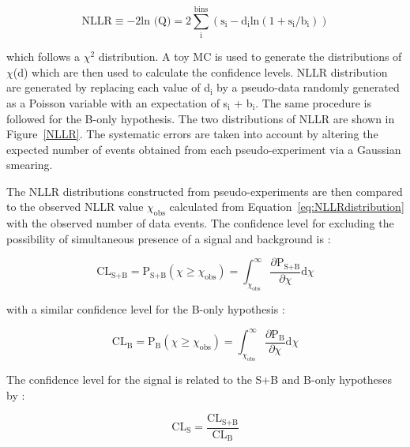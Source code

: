 \documentclass[main.tex]{subfiles}
\begin{document}
\begin{equation}\label{eq:NLLRdistribution}
\text{NLLR} \equiv -\text{2} \text{ln (Q)} = \text{2} \sum _\text{i}^{\text{bins}} (\text{s}_\text{i}  - \text{d}_\text{i} \text{ln} (1 + \text{s}_\text{i}/\text{b}_\text{i}))
\end{equation}


\bigskip


\NI which follows a $\chi^\text{2}$ distribution. A toy MC is used to generate the distributions of $\chi$(d) which are then used to calculate the confidence levels. NLLR distribution are generated by replacing each value of d$_\text{i}$ by a pseudo-data randomly generated as a Poisson variable with an expectation of s$_\text{i}$ + b$_\text{i}$. The same procedure is followed for the B-only hypothesis. The two distributions of NLLR are shown in Figure~\ref{NLLR}. The systematic errors are taken into account by altering the expected number of events obtained from each pseudo-experiment via a Gaussian smearing.


\bigskip


\NI The NLLR distributions constructed from pseudo-experiments are then compared to the observed NLLR value $\chi_{\text{obs}}$ calculated from Equation~\ref{eq:NLLRdistribution} with the observed number of data events. The confidence level for excluding the possibility  of simultaneous presence of a signal and background is : 


\begin{equation}
\text{CL}_{\text{S+B}} = \text{P}_{\text{S+B}} (\chi \geq \chi_{\text{obs}} ) = \int_{\chi_{\text{obs}}}^{\infty} \frac{\partial \text{P}_{\text{S+B}} }{\partial \chi} 	\text{d}\chi 
\end{equation}


\bigskip


\NI with a similar confidence level for the B-only hypothesis : 

\begin{equation}
\text{CL}_{\text{B}} = \text{P}_{\text{B}} (\chi \geq \chi_{\text{obs}} ) = \int_{\chi_{\text{obs}}}^{\infty} \frac{\partial \text{P}_{\text{B}} }{\partial \chi} \text{d}\chi 
\end{equation}


\bigskip


\NI The confidence level for the signal is related to the S+B and B-only hypotheses by : 


\begin{equation}
\text{CL}_{\text{S}} = \frac{\text{CL}_{\text{S+B}} }{\text{CL}_{\text{B}} } 
\end{equation}
\end{document}
